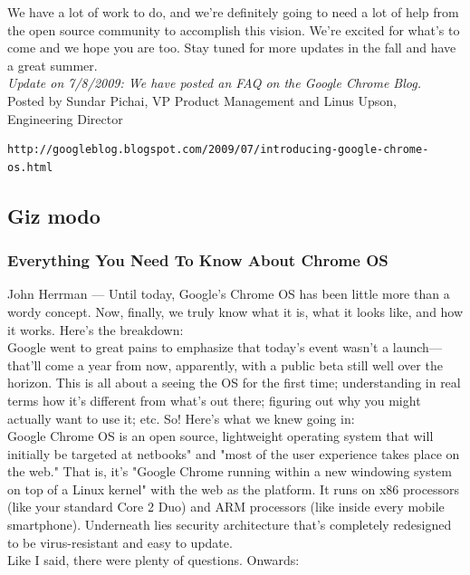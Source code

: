 \documentclass{article}
\begin{document}
	We have a lot of work to do, and we're definitely going to need a lot of help from the open source community to accomplish this vision. We're excited for what's to come and we hope you are too. Stay tuned for more updates in the fall and have a great summer. \\ 

	\textit{Update on 7/8/2009: We have posted an FAQ on the Google Chrome Blog.}\\

	Posted by Sundar Pichai, VP Product Management and Linus Upson, Engineering Director
	\begin{verbatim}http://googleblog.blogspot.com/2009/07/introducing-google-chrome-os.html\end{verbatim}
	\newpage
	\subsection{Giz modo}
	\subsubsection{Everything You Need To Know About Chrome OS}
	  John Herrman —  Until today, Google's Chrome OS has been little more than a wordy concept. Now, finally, we truly know what it is, what it looks like, and how it works. Here's the breakdown:\\

	  Google went to great pains to emphasize that today's event wasn't a launch—that'll come a year from now, apparently, with a public beta still well over the horizon. This is all about a seeing the OS for the first time; understanding in real terms how it's different from what's out there; figuring out why you might actually want to use it; etc. So! Here's what we knew going in:\\

	  Google Chrome OS is an open source, lightweight operating system that will initially be targeted at netbooks" and "most of the user experience takes place on the web." That is, it's "Google Chrome running within a new windowing system on top of a Linux kernel" with the web as the platform. It runs on x86 processors (like your standard Core 2 Duo) and ARM processors (like inside every mobile smartphone). Underneath lies security architecture that's completely redesigned to be virus-resistant and easy to update.\\

	  Like I said, there were plenty of questions. Onwards:\\
\end{document}
